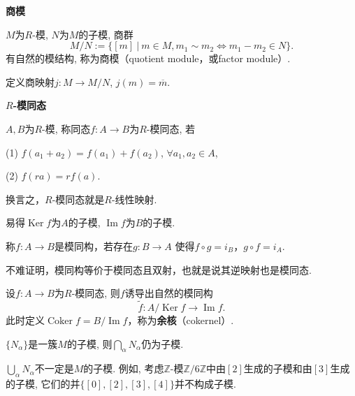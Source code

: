		
	\begin{definition} \textbf{商模}\par
		$M$为$R$-模, $N$为$M$的子模, 商群$$M/N:=\{[m]\ \big|\ m\in M, m_1\sim m_2\iff m_1-m_2\in N\}.$$
    有自然的模结构, 称为商模（quotient module，或factor module）.\par
        定义商映射$j:M\rightarrow M/N$, $j(m)=\overline{m}$.
	\end{definition}

	\begin{definition} \textbf{$R$-模同态}\par
		$A, B$为$R$-模, 称同态$f:A\rightarrow B$为$R$-模同态, 若\par
		\qquad (1) $f(a_1+a_2)=f(a_1)+f(a_2)$, $\forall a_1,a_2\in A$,\par
		\qquad (2) $f(ra)=rf(a)$.\par
        换言之，$R$-模同态就是$R$-线性映射.\par
        易得$\operatorname{Ker}f$为$A$的子模, $\operatorname{Im}f$为$B$的子模.\par
        称$f:A\rightarrow B$是模同构，若存在$g:B\rightarrow A$
        使得$f\circ g=i_B$，$g\circ f=i_A$.\par
        不难证明，模同构等价于模同态且双射，也就是说其逆映射也是模同态.
	\end{definition}
	
	\begin{proposition}
		设$f:A\rightarrow B$为$R$-模同态, 则$f$诱导出自然的模同构
			$$\tilde{f}: A/\operatorname{Ker} f
            \rightarrow\operatorname{Im}f.$$
	此时定义$\operatorname{Coker}f=B/\operatorname{Im}f$，称为\textbf{余核}（cokernel）.
	\end{proposition}
	
	\begin{proposition}
		$\{N_\alpha\}$是一簇$M$的子模, 
        则$\bigcap\limits_\alpha N_\alpha$仍为子模.
	\end{proposition}
	
	\begin{remark}
		$\bigcup\limits_\alpha N_\alpha$不一定是$M$的子模. 例如, 考虑$\mathbb{Z}$-模$\mathbb{Z}/6\mathbb{Z}$中由$[2]$生成的子模和由$[3]$生成的子模, 它们的并$\{[0],[2],[3],[4]\}$并不构成子模.
	\end{remark}
	
